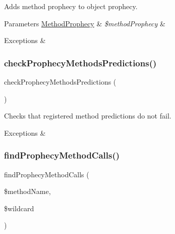 Adds method prophecy to object prophecy.


\begin{DoxyParams}[1]{Parameters}
\mbox{\hyperlink{class_prophecy_1_1_prophecy_1_1_method_prophecy}{Method\+Prophecy}} & {\em \$method\+Prophecy} & \\
\hline
\end{DoxyParams}

\begin{DoxyExceptions}{Exceptions}
{\em } & \\
\hline
\end{DoxyExceptions}
\mbox{\label{class_prophecy_1_1_prophecy_1_1_object_prophecy_a302b2878761b1e1f40bb64e8ea3d334b}} 
\subsubsection{\texorpdfstring{check\+Prophecy\+Methods\+Predictions()}{checkProphecyMethodsPredictions()}}
{\footnotesize\ttfamily check\+Prophecy\+Methods\+Predictions (\begin{DoxyParamCaption}{ }\end{DoxyParamCaption})}

Checks that registered method predictions do not fail.


\begin{DoxyExceptions}{Exceptions}
{\em } & \\
\hline
\end{DoxyExceptions}
\mbox{\label{class_prophecy_1_1_prophecy_1_1_object_prophecy_a1e3a9cc434b8068618fb0e7edbcb93b3}} 
\subsubsection{\texorpdfstring{find\+Prophecy\+Method\+Calls()}{findProphecyMethodCalls()}}
{\footnotesize\ttfamily find\+Prophecy\+Method\+Calls (\begin{DoxyParamCaption}\item[{}]{\$method\+Name,  }\item[{\mbox{\hyperlink{class_prophecy_1_1_argument_1_1_arguments_wildcard}{Arguments\+Wildcard}}}]{\$wildcard }\end{DoxyParamCaption})}

